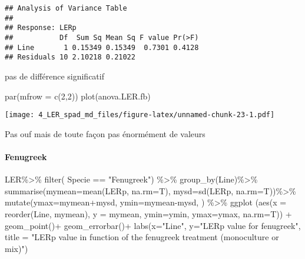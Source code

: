 \documentclass[
]{article}
\newenvironment{Shaded}{\begin{snugshade}}{\end{snugshade}}
\newcommand{\AttributeTok}[1]{\textcolor[rgb]{0.77,0.63,0.00}{#1}}
\newcommand{\DecValTok}[1]{\textcolor[rgb]{0.00,0.00,0.81}{#1}}
\newcommand{\FunctionTok}[1]{\textcolor[rgb]{0.00,0.00,0.00}{#1}}
\newcommand{\NormalTok}[1]{#1}
\newcommand{\SpecialCharTok}[1]{\textcolor[rgb]{0.00,0.00,0.00}{#1}}
\newcommand{\StringTok}[1]{\textcolor[rgb]{0.31,0.60,0.02}{#1}}
\begin{document}
\begin{verbatim}
## Analysis of Variance Table
## 
## Response: LERp
##           Df  Sum Sq Mean Sq F value Pr(>F)
## Line       1 0.15349 0.15349  0.7301 0.4128
## Residuals 10 2.10218 0.21022
\end{verbatim}

pas de différence significatif

\begin{Shaded}
\begin{Highlighting}[]
\FunctionTok{par}\NormalTok{(}\AttributeTok{mfrow =} \FunctionTok{c}\NormalTok{(}\DecValTok{2}\NormalTok{,}\DecValTok{2}\NormalTok{))}
\FunctionTok{plot}\NormalTok{(anova.LER.fb)}
\end{Highlighting}
\end{Shaded}

\texttt{[image: 4\_LER\_spad\_md\_files/figure-latex/unnamed-chunk-23-1.pdf]}

Pas ouf mais de toute façon pas énormément de valeurs

\hypertarget{fenugreek}{%
\paragraph{Fenugreek}\label{fenugreek}}

\begin{Shaded}
\begin{Highlighting}[]
\NormalTok{LER}\SpecialCharTok{\%\textgreater{}\%}
  \FunctionTok{filter}\NormalTok{( Specie }\SpecialCharTok{==} \StringTok{"Fenugreek"}\NormalTok{) }\SpecialCharTok{\%\textgreater{}\%}
  \FunctionTok{group\_by}\NormalTok{(Line)}\SpecialCharTok{\%\textgreater{}\%}
  \FunctionTok{summarise}\NormalTok{(}\AttributeTok{mymean=}\FunctionTok{mean}\NormalTok{(LERp, }\AttributeTok{na.rm=}\NormalTok{T),}
            \AttributeTok{mysd=}\FunctionTok{sd}\NormalTok{(LERp, }\AttributeTok{na.rm=}\NormalTok{T))}\SpecialCharTok{\%\textgreater{}\%}
  \FunctionTok{mutate}\NormalTok{(}\AttributeTok{ymax=}\NormalTok{mymean}\SpecialCharTok{+}\NormalTok{mysd, }\AttributeTok{ymin=}\NormalTok{mymean}\SpecialCharTok{{-}}\NormalTok{mysd, ) }\SpecialCharTok{\%\textgreater{}\%}
  \FunctionTok{ggplot}\NormalTok{ (}\FunctionTok{aes}\NormalTok{(}\AttributeTok{x =} \FunctionTok{reorder}\NormalTok{(Line, mymean), }\AttributeTok{y =}\NormalTok{ mymean,}
              \AttributeTok{ymin=}\NormalTok{ymin, }\AttributeTok{ymax=}\NormalTok{ymax, }\AttributeTok{na.rm=}\NormalTok{T)) }\SpecialCharTok{+} 
  \FunctionTok{geom\_point}\NormalTok{()}\SpecialCharTok{+}
  \FunctionTok{geom\_errorbar}\NormalTok{()}\SpecialCharTok{+}
  \FunctionTok{labs}\NormalTok{(}\AttributeTok{x=}\StringTok{"Line"}\NormalTok{, }\AttributeTok{y=}\StringTok{"LERp value for fenugreek"}\NormalTok{, }\AttributeTok{title =} \StringTok{"LERp value in function of the fenugreek treatment (monoculture or mix)"}\NormalTok{)}
\end{Highlighting}
\end{Shaded}
\end{document}
